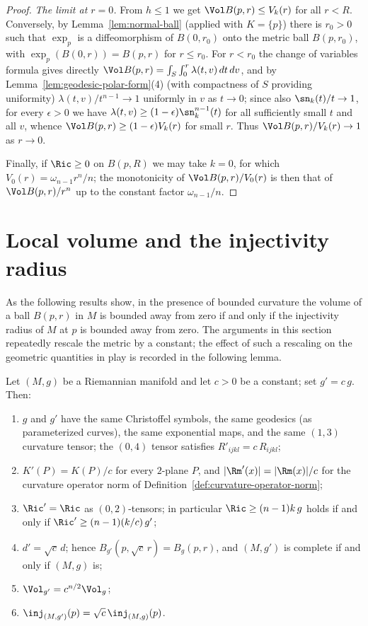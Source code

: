 \begin{proof}
\emph{The limit at $r=0$.} From $h\le1$ we get $\Vol B(p,r)\le
V_k(r)$ for all $r<R$. Conversely, by
Lemma~\ref{lem:normal-ball} (applied with $K=\{p\}$) there is
$r_0>0$ such that $\exp_p$ is a diffeomorphism of $B(0,r_0)$ onto
the metric ball $B(p,r_0)$, with $\exp_p(B(0,r))=B(p,r)$ for
$r\le r_0$. For $r<r_0$ the change of
variables formula gives directly
$\Vol B(p,r)=\int_S\int_0^r\lambda(t,v)\,dt\,dv$, and by
Lemma~\ref{lem:geodesic-polar-form}(4) (with compactness of $S$
providing uniformity) $\lambda(t,v)/t^{n-1}\to1$ uniformly in $v$
as $t\to0$; since also $\sn_k(t)/t\to1$, for every $\epsilon>0$ we
have $\lambda(t,v)\ge(1-\epsilon)\sn_k^{n-1}(t)$ for all
sufficiently small $t$ and all $v$, whence $\Vol B(p,r)\ge
(1-\epsilon)V_k(r)$ for small $r$. Thus $\Vol B(p,r)/V_k(r)\to1$
as $r\to0$.

Finally, if $\Ric\ge0$ on $B(p,R)$ we may take $k=0$, for which
$V_0(r)=\omega_{n-1}r^n/n$; the monotonicity of $\Vol
B(p,r)/V_0(r)$ is then that of $\Vol B(p,r)/r^n$ up to the constant
factor $\omega_{n-1}/n$.
\end{proof}

\section{Local volume and the injectivity radius}

As the following results show, in the presence of bounded curvature the volume
of a ball $B(p,r)$ in $M$ is bounded away from zero if and only if the
injectivity radius of $M$ at $p$ is bounded away from zero.
The arguments in this section repeatedly rescale the metric by a
constant; the effect of such a rescaling on the geometric
quantities in play is recorded in the following lemma.

\begin{lemma}
\label{lem:metric-rescaling}
Let $(M,g)$ be a Riemannian manifold and let $c>0$ be a constant;
set $g'=c\,g$. Then:
\begin{enumerate}
\item $g$ and $g'$ have the same Christoffel symbols, the same
geodesics (as parameterized curves), the same exponential maps, and
the same $(1,3)$ curvature tensor; the $(0,4)$ tensor satisfies
$R'_{ijkl}=c\,R_{ijkl}$;
\item $K'(P)=K(P)/c$ for every $2$-plane $P$, and
$|\Rm'(x)|=|\Rm(x)|/c$ for the curvature operator norm of
Definition~\ref{def:curvature-operator-norm};
\item $\Ric'=\Ric$ as $(0,2)$-tensors; in particular
$\Ric\ge(n-1)k\,g$ holds if and only if
$\Ric'\ge(n-1)(k/c)\,g'$;
\item $d'=\sqrt{c}\,d$; hence $B_{g'}(p,\sqrt{c}\,r)=B_g(p,r)$,
and $(M,g')$ is complete if and only if $(M,g)$ is;
\item $\Vol_{g'}=c^{n/2}\Vol_g$;
\item $\inj_{(M,g')}(p)=\sqrt{c}\,\inj_{(M,g)}(p)$.
\end{enumerate}
\end{lemma}

